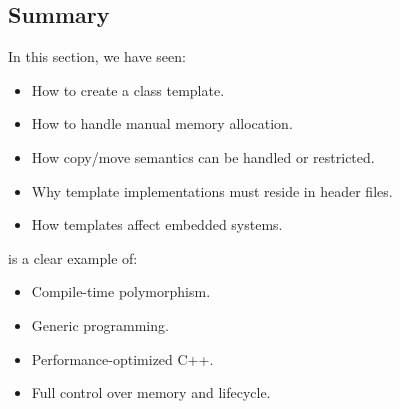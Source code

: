 \subsection{Summary}
\label{c5:sec:classsummary}
In this section, we have seen:
\begin{itemize}
  \item How to create a class template.
  \item How to handle manual memory allocation.
  \item How copy/move semantics can be handled or restricted.
  \item Why template implementations must reside in header files.
  \item How templates affect embedded systems.
\end{itemize}
 is a clear example of:
\begin{itemize}
  \item Compile-time polymorphism.
  \item Generic programming.
  \item Performance-optimized C++.
  \item Full control over memory and lifecycle.
\end{itemize}
